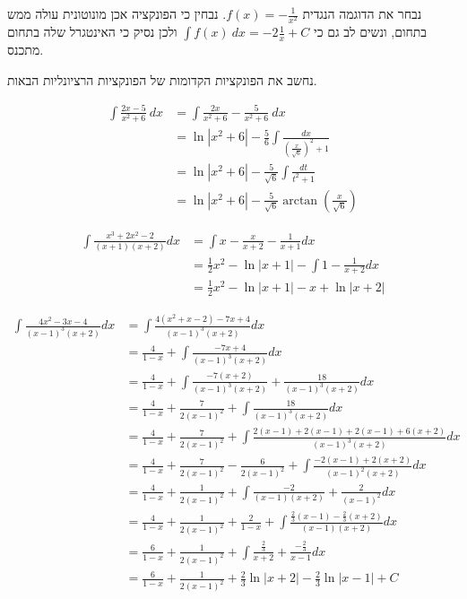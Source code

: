 נבחר את הדוגמה הנגדית $f(x) = -\frac{1}{x^2}$.
נבחין כי הפונקציה אכן מונוטונית עולה ממש בתחום, ונשים לב גם כי $\int f(x)\ dx = -2 \frac{1}{x} + C$ ולכן נסיק כי האינטגרל שלה בתחום מתכנס.

\Question{}
נחשב את הפונקציות הקדומות של הפונקציות הרציונליות הבאות.

\Subquestion{}
\begin{align*}
	\int \frac{2x - 5}{x^2 + 6}\ dx
	& = \int \frac{2x}{x^2 + 6} - \frac{5}{x^2 + 6}\ dx \\
	& = \ln |x^2 + 6| - \frac{5}{6} \int \frac{dx}{{(\frac{x}{\sqrt{6}})}^2 + 1} \\
	& = \ln |x^2 + 6| - \frac{5}{\sqrt{6}} \int \frac{dt}{t^2 + 1} \\
	& = \ln |x^2 + 6| - \frac{5}{\sqrt{6}} \arctan(\frac{x}{\sqrt{6}})
\end{align*}

\Subquestion{}
\begin{align*}
	\int \frac{x^3 + 2x^2 - 2}{(x + 1)(x + 2)}dx
	& = \int x - \frac{x}{x + 2} - \frac{1}{x + 1} dx \\
	& = \frac{1}{2} x^2 - \ln|x + 1| - \int 1 - \frac{1}{x + 2} dx \\
	& = \frac{1}{2} x^2 - \ln|x + 1| - x + \ln|x + 2|
\end{align*}

\Subquestion{}
\begin{align*}
	\int \frac{4x^2 - 3x - 4}{{(x - 1)}^3 (x + 2)} dx
	& = \int \frac{4(x^2 + x - 2) - 7x + 4}{{(x - 1)}^3 (x + 2)} dx \\
	& = \frac{4}{1 - x} + \int \frac{- 7x + 4}{{(x - 1)}^3 (x + 2)} dx \\
	& = \frac{4}{1 - x} + \int \frac{- 7(x + 2)}{{(x - 1)}^3 (x + 2)} + \frac{18}{{(x - 1)}^3 (x + 2)} dx \\
	& = \frac{4}{1 - x} + \frac{7}{2{(x - 1)}^2} + \int \frac{18}{{(x - 1)}^3 (x + 2)} dx \\
	& = \frac{4}{1 - x} + \frac{7}{2{(x - 1)}^2} + \int \frac{2(x - 1) + 2(x - 1) + 2(x - 1) + 6(x + 2)}{{(x - 1)}^3 (x + 2)} dx \\
	& = \frac{4}{1 - x} + \frac{7}{2{(x - 1)}^2} - \frac{6}{2{(x - 1)}^2} + \int \frac{-2(x - 1) + 2(x + 2)}{{(x - 1)}^2 (x + 2)} dx \\
	& = \frac{4}{1 - x} + \frac{1}{2{(x - 1)}^2} + \int \frac{-2}{(x - 1) (x + 2)} + \frac{2}{{(x - 1)}^2} dx \\
	& = \frac{4}{1 - x} + \frac{1}{2{(x - 1)}^2} + \frac{2}{1 - x} + \int \frac{\frac{2}{3}(x - 1) - \frac{2}{3}(x + 2)}{(x - 1) (x + 2)} dx \\
	& = \frac{6}{1 - x} + \frac{1}{2{(x - 1)}^2} + \int \frac{\frac{2}{3}}{x + 2} + \frac{-\frac{2}{3}}{x - 1} dx \\
	& = \frac{6}{1 - x} + \frac{1}{2{(x - 1)}^2} + \frac{2}{3} \ln|x + 2| - \frac{2}{3} \ln|x - 1| + C
\end{align*}

